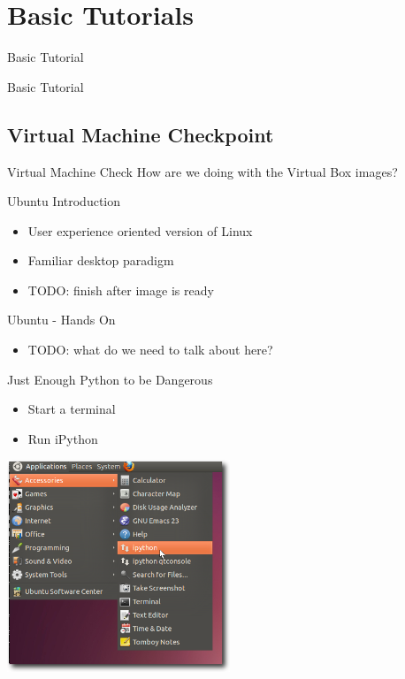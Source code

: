 \section{Basic Tutorials}
\begin{frame}{Basic Tutorial}
\fontsize{36pt}{36pt}\selectfont
\center
\begin{center}
Basic Tutorial
\end{center}
\end{frame}

\subsection{Virtual Machine Checkpoint}
\begin{frame}{Virtual Machine Check}
How are we doing with the Virtual Box images?
\end{frame}

\begin{frame}{Ubuntu Introduction}
\begin{itemize}
  \item User experience oriented version of Linux
  \item Familiar desktop paradigm
  \item TODO: finish after image is ready
\end{itemize}
\end{frame}

\begin{frame}{Ubuntu - Hands On  }
\begin{itemize}
  \item TODO: what do we need to talk about here?
\end{itemize}
\end{frame}

\begin{frame}{Just Enough Python to be Dangerous}
\begin{itemize}
  \item Start a terminal
  \item Run iPython
\end{itemize}
\begin{center}
  \includegraphics[width=0.5\textwidth]{Images/iPythonLaunch_shadow}
\end{center}
\end{frame}

